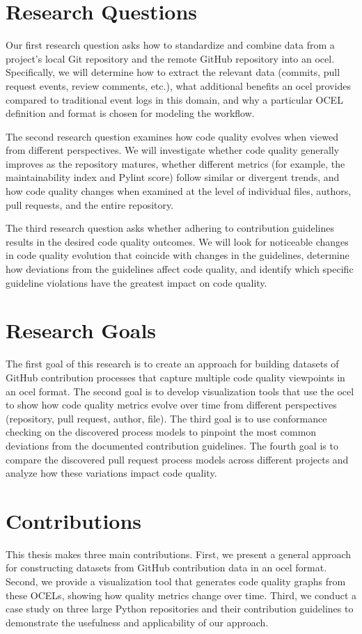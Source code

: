 \section{Research Questions}
Our first research question asks how to standardize and combine data from a project’s local Git repository and the remote GitHub repository into an \ac{ocel}. Specifically, we will determine how to extract the relevant data (commits, pull request events, review comments, etc.), what additional benefits an \ac{ocel} provides compared to traditional event logs in this domain, and why a particular OCEL definition and format is chosen for modeling the workflow.

The second research question examines how code quality evolves when viewed from different perspectives. We will investigate whether code quality generally improves as the repository matures, whether different metrics (for example, the maintainability index and Pylint score) follow similar or divergent trends, and how code quality changes when examined at the level of individual files, authors, pull requests, and the entire repository.

The third research question asks whether adhering to contribution guidelines results in the desired code quality outcomes. We will look for noticeable changes in code quality evolution that coincide with changes in the guidelines, determine how deviations from the guidelines affect code quality, and identify which specific guideline violations have the greatest impact on code quality.

\section{Research Goals}
The first goal of this research is to create an approach for building datasets of GitHub contribution processes that capture multiple code quality viewpoints in an \ac{ocel} format. The second goal is to develop visualization tools that use the \ac{ocel} to show how code quality metrics evolve over time from different perspectives (repository, pull request, author, file). The third goal is to use conformance checking on the discovered process models to pinpoint the most common deviations from the documented contribution guidelines. The fourth goal is to compare the discovered pull request process models across different projects and analyze how these variations impact code quality.

\section{Contributions}
This thesis makes three main contributions. First, we present a general approach for constructing datasets from GitHub contribution data in an \ac{ocel} format. Second, we provide a visualization tool that generates code quality graphs from these OCELs, showing how quality metrics change over time. Third, we conduct a case study on three large Python repositories and their contribution guidelines to demonstrate the usefulness and applicability of our approach.

